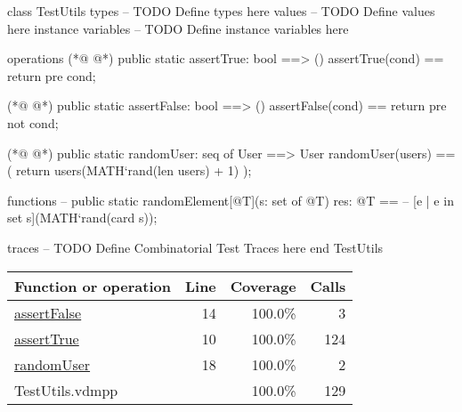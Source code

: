 \begin{vdmpp}[breaklines=true]
class TestUtils
 types
 -- TODO Define types here
 values
 -- TODO Define values here
 instance variables
 -- TODO Define instance variables here
 
 operations
(*@
\label{assertTrue:10}
@*)
  public static assertTrue: bool ==> ()
   assertTrue(cond) == return
   pre cond;
   
(*@
\label{assertFalse:14}
@*)
   public static assertFalse: bool ==> ()
   assertFalse(cond) == return
   pre not cond;
   
(*@
\label{randomUser:18}
@*)
   public static randomUser: seq of User ==> User
   randomUser(users) == (
    return users(MATH`rand(len users) + 1)
   );
 
 functions
--  public static randomElement[@T](s: set of @T) res: @T ==
--  [e | e in set s](MATH`rand(card s));
  
 traces
 -- TODO Define Combinatorial Test Traces here
end TestUtils
\end{vdmpp}
\bigskip
\begin{longtable}{|l|r|r|r|}
\hline
Function or operation & Line & Coverage & Calls \\
\hline
\hline
\hyperref[assertFalse:14]{assertFalse} & 14&100.0\% & 3 \\
\hline
\hyperref[assertTrue:10]{assertTrue} & 10&100.0\% & 124 \\
\hline
\hyperref[randomUser:18]{randomUser} & 18&100.0\% & 2 \\
\hline
\hline
TestUtils.vdmpp & & 100.0\% & 129 \\
\hline
\end{longtable}

